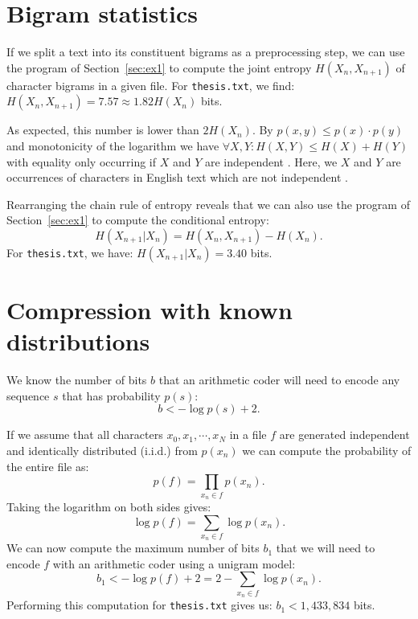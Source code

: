 \documentclass[10pt,a4paper,oneside,onecolumn]{article}
\makeatletter
\newcommand*{\thesisTXT}{{\tt thesis.txt}\xspace}
\newcommand*{\iid}{i.i.d.\@}
\makeatother
\begin{document}
\section{Bigram statistics}\label{sec:ex2}

If we split a text into its constituent bigrams as a preprocessing step, we can
use the program of Section~\ref{sec:ex1} to compute the joint entropy $H(X_n,
X_{n+1})$ of character bigrams in a given file. For \thesisTXT, we
find: $H(X_n, X_{n+1}) = 7.57 \approx 1.82H(X_n)$ bits.\footnotemark
{}

As expected, this number is lower than $2H(X_n)$. By $p(x,y) \le p(x) \cdot
p(y)$ and monotonicity of the logarithm we have $\forall X,Y: H(X, Y) \le H(X) +
H(Y)$ with equality only occurring if $X$ and $Y$ are independent
\cite[p.~138]{mackay}. Here, we $X$ and $Y$ are occurrences of characters in
English text which are not independent \cite[p.~22-24]{mackay}.

Rearranging the chain rule of entropy \cite[p.~139]{mackay} reveals that we can
also use the program of Section~\ref{sec:ex1} to compute the conditional
entropy:
\begin{equation}
    H(X_{n+1} | X_n) = H(X_n, X_{n+1}) - H(X_n).
\end{equation}
For \thesisTXT, we have: $H(X_{n+1} | X_n) = 3.40$ bits.


\section{Compression with known distributions}\label{sec:ex3}

We know \cite[p.~21]{it4} the number of bits $b$ that an arithmetic coder
will need to encode any sequence $s$ that has probability $p(s)$:
\begin{equation}
    b < -\log p(s) + 2.
\end{equation}

If we assume that all characters $x_0, x_1, \cdots, x_N$ in a file $f$ are
generated independent and identically distributed (\iid) from $p(x_n)$ we can
compute the probability of the entire file as:
\begin{equation}
    p(f) = \prod\limits_{x_n \in f} p(x_n).
\end{equation}
Taking the logarithm on both sides gives:
\begin{equation}\label{eq:unigram-logprob}
    \log p(f) = \sum\limits_{x_n \in f} \log p(x_n).
\end{equation}
We can now compute the maximum number of bits $b_1$ that we will need to encode
$f$ with an arithmetic coder using a unigram model:
\begin{equation}\label{eq:unigram-nbits}
    b_1 < -\log p(f) + 2 = 2 - \sum\limits_{x_n \in f} \log p(x_n).
\end{equation}
Performing this computation for \thesisTXT gives us: $b_1 < 1,433,834$ bits.
\end{document}
